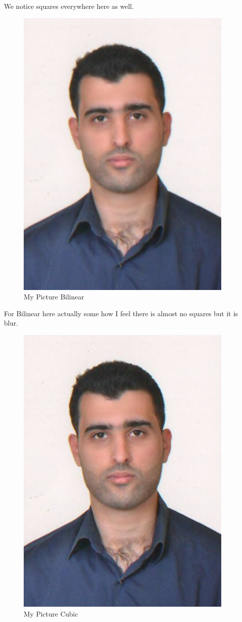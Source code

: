 \documentclass{article}
\begin{document}
We notice squares everywhere here as well.
\begin{figure}[H]
	\begin{center}
		\includegraphics[scale=1]{mypictureBilinear.png}
	\end{center}
	\caption{My Picture Bilinear} 
\end{figure}
For Bilinear here actually some how I feel there is almost no squares but it is blur.
\begin{figure}[H]
	\begin{center}
		\includegraphics[scale=1]{mypictureCubic.png}
	\end{center}
	\caption{My Picture Cubic} 
\end{figure}
\end{document}
